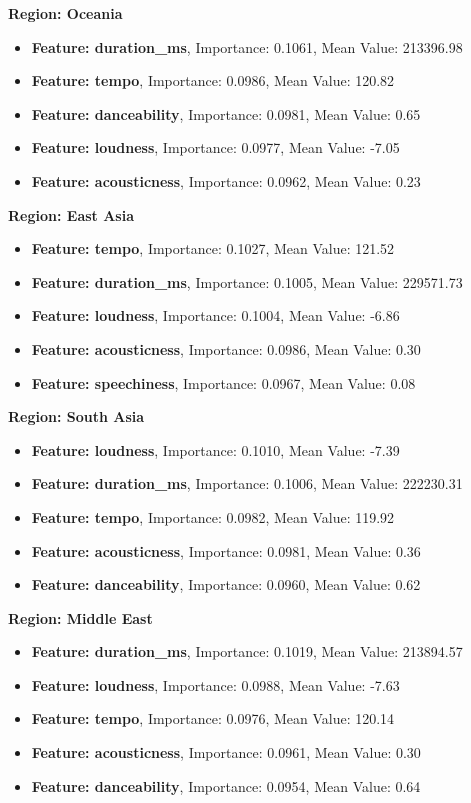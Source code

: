 \textbf{Region: Oceania }
\begin{itemize}
    \item \textbf{Feature: duration\_ms}, Importance: 0.1061, Mean Value: 213396.98
    \item \textbf{Feature: tempo}, Importance: 0.0986, Mean Value: 120.82
    \item \textbf{Feature: danceability}, Importance: 0.0981, Mean Value: 0.65
    \item \textbf{Feature: loudness}, Importance: 0.0977, Mean Value: -7.05
    \item \textbf{Feature: acousticness}, Importance: 0.0962, Mean Value: 0.23
\end{itemize}

\textbf{Region: East Asia }
\begin{itemize}
    \item \textbf{Feature: tempo}, Importance: 0.1027, Mean Value: 121.52
    \item \textbf{Feature: duration\_ms}, Importance: 0.1005, Mean Value: 229571.73
    \item \textbf{Feature: loudness}, Importance: 0.1004, Mean Value: -6.86
    \item \textbf{Feature: acousticness}, Importance: 0.0986, Mean Value: 0.30
    \item \textbf{Feature: speechiness}, Importance: 0.0967, Mean Value: 0.08
\end{itemize}

\textbf{Region: South Asia }
\begin{itemize}
    \item \textbf{Feature: loudness}, Importance: 0.1010, Mean Value: -7.39
    \item \textbf{Feature: duration\_ms}, Importance: 0.1006, Mean Value: 222230.31
    \item \textbf{Feature: tempo}, Importance: 0.0982, Mean Value: 119.92
    \item \textbf{Feature: acousticness}, Importance: 0.0981, Mean Value: 0.36
    \item \textbf{Feature: danceability}, Importance: 0.0960, Mean Value: 0.62
\end{itemize}


\textbf{Region: Middle East }
\begin{itemize}
    \item \textbf{Feature: duration\_ms}, Importance: 0.1019, Mean Value: 213894.57
    \item \textbf{Feature: loudness}, Importance: 0.0988, Mean Value: -7.63
    \item \textbf{Feature: tempo}, Importance: 0.0976, Mean Value: 120.14
    \item \textbf{Feature: acousticness}, Importance: 0.0961, Mean Value: 0.30
    \item \textbf{Feature: danceability}, Importance: 0.0954, Mean Value: 0.64
\end{itemize}


